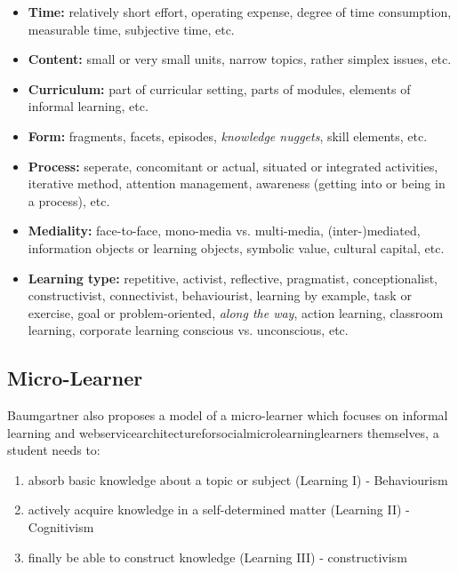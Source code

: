 \begin{itemize}
    \item \textbf{Time:} relatively short effort, operating expense, degree of time 
        consumption,
        measurable time, subjective time, etc.
    \item \textbf{Content:} small or very small units, narrow topics, rather simplex 
        issues, etc.
    \item \textbf{Curriculum:} part of curricular setting, parts of modules, 
        elements of informal
        learning, etc.
    \item \textbf{Form:} fragments, facets, episodes, \textit{knowledge nuggets}, 
        skill elements, etc.
    \item \textbf{Process:} seperate, concomitant or actual, situated or integrated 
        activities,
        iterative method, attention management, awareness (getting into or being 
        in a process), etc.
    \item \textbf{Mediality:} face-to-face, mono-media vs. multi-media, 
        (inter-)mediated,
        information objects or learning objects, symbolic value, cultural 
        capital, etc.
    \item \textbf{Learning type:} repetitive, activist, reflective, pragmatist, 
        conceptionalist, 
        constructivist, connectivist, behaviourist, learning by example, task 
        or exercise, goal
        or problem-oriented, \textit{along the way}, action learning, classroom 
        learning, corporate 
        learning conscious vs. unconscious, etc.
\end{itemize}


\subsection{Micro-Learner}

Baumgartner also proposes a model of a micro-learner which focuses on informal learning
and webservicearchitectureforsocialmicrolearninglearners themselves, a student needs to: 
\cite{webservicearchitectureforsocialmicrolearning}

\begin{enumerate}
    \item absorb basic knowledge about a topic or subject (Learning I) - Behaviourism
    \item actively acquire knowledge in a self-determined matter (Learning II) - Cognitivism
    \item finally be able to construct knowledge (Learning III) - constructivism
\end{enumerate}

